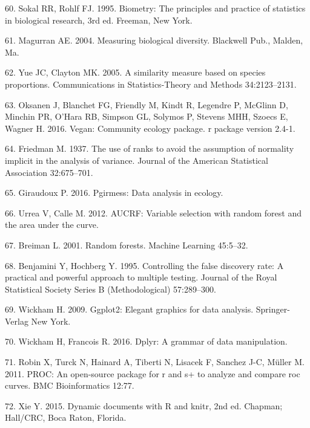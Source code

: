 \documentclass[12pt,]{article}
\begin{document}
\hypertarget{ref-sokal_biometrystats_1995}{}
60. Sokal RR, Rohlf FJ. 1995. Biometry: The principles and practice of
statistics in biological research, 3rd ed. Freeman, New York.

\hypertarget{ref-magurran_measuring_2004}{}
61. Magurran AE. 2004. Measuring biological diversity. Blackwell Pub.,
Malden, Ma.

\hypertarget{ref-yue_thetaYC_2005}{}
62. Yue JC, Clayton MK. 2005. A similarity measure based on species
proportions. Communications in Statistics-Theory and Methods
34:2123--2131.

\hypertarget{ref-oksanen_vegan_2016}{}
63. Oksanen J, Blanchet FG, Friendly M, Kindt R, Legendre P, McGlinn D,
Minchin PR, O'Hara RB, Simpson GL, Solymos P, Stevens MHH, Szoecs E,
Wagner H. 2016. Vegan: Community ecology package. r package version
2.4-1.

\hypertarget{ref-friedman_1937}{}
64. Friedman M. 1937. The use of ranks to avoid the assumption of
normality implicit in the analysis of variance. Journal of the American
Statistical Association 32:675--701.

\hypertarget{ref-pgirmess}{}
65. Giraudoux P. 2016. Pgirmess: Data analysis in ecology.

\hypertarget{ref-AUCRF}{}
66. Urrea V, Calle M. 2012. AUCRF: Variable selection with random forest
and the area under the curve.

\hypertarget{ref-breiman_rf_2001}{}
67. Breiman L. 2001. Random forests. Machine Learning 45:5--32.

\hypertarget{ref-Benjamini_Hochberg_1995}{}
68. Benjamini Y, Hochberg Y. 1995. Controlling the false discovery rate:
A practical and powerful approach to multiple testing. Journal of the
Royal Statistical Society Series B (Methodological) 57:289--300.

\hypertarget{ref-ggplot2}{}
69. Wickham H. 2009. Ggplot2: Elegant graphics for data analysis.
Springer-Verlag New York.

\hypertarget{ref-dplyr}{}
70. Wickham H, Francois R. 2016. Dplyr: A grammar of data manipulation.

\hypertarget{ref-pROC}{}
71. Robin X, Turck N, Hainard A, Tiberti N, Lisacek F, Sanchez J-C,
Müller M. 2011. PROC: An open-source package for r and s+ to analyze and
compare roc curves. BMC Bioinformatics 12:77.

\hypertarget{ref-knitr2015}{}
72. Xie Y. 2015. Dynamic documents with R and knitr, 2nd ed. Chapman;
Hall/CRC, Boca Raton, Florida.
\end{document}
